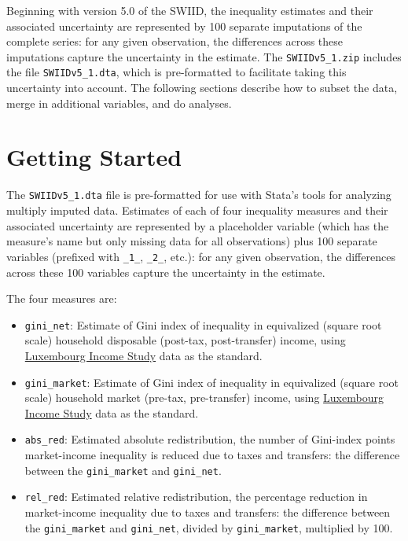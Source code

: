 \documentclass[11pt,]{article}
\providecommand{\tightlist}{%
	\setlength{\itemsep}{0pt}\setlength{\parskip}{0pt}}
\theoremstyle{definition}
\theoremstyle{definition}
\theoremstyle{remark}
\begin{document}
Beginning with version 5.0 of the SWIID, the inequality estimates and
their associated uncertainty are represented by 100 separate imputations
of the complete series: for any given observation, the differences
across these imputations capture the uncertainty in the estimate. The
\texttt{SWIIDv5\_1.zip} includes the file \texttt{SWIIDv5\_1.dta}, which
is pre-formatted to facilitate taking this uncertainty into account. The
following sections describe how to subset the data, merge in additional
variables, and do analyses.

\section{Getting Started}\label{getting-started}

The \texttt{SWIIDv5\_1.dta} file is pre-formatted for use with Stata's
tools for analyzing multiply imputed data. Estimates of each of four
inequality measures and their associated uncertainty are represented by
a placeholder variable (which has the measure's name but only missing
data for all observations) plus 100 separate variables (prefixed with
\texttt{\_1\_}, \texttt{\_2\_}, etc.): for any given observation, the
differences across these 100 variables capture the uncertainty in the
estimate.

The four measures are:

\begin{itemize}
\tightlist
\item
  \texttt{gini\_net}: Estimate of Gini index of inequality in
  equivalized (square root scale) household disposable (post-tax,
  post-transfer) income, using
  \href{http://www.lisdatacenter.org}{Luxembourg Income Study} data as
  the standard.
\item
  \texttt{gini\_market}: Estimate of Gini index of inequality in
  equivalized (square root scale) household market (pre-tax,
  pre-transfer) income, using
  \href{http://www.lisdatacenter.org}{Luxembourg Income Study} data as
  the standard.
\item
  \texttt{abs\_red}: Estimated absolute redistribution, the number of
  Gini-index points market-income inequality is reduced due to taxes and
  transfers: the difference between the \texttt{gini\_market} and
  \texttt{gini\_net}.
\item
  \texttt{rel\_red}: Estimated relative redistribution, the percentage
  reduction in market-income inequality due to taxes and transfers: the
  difference between the \texttt{gini\_market} and \texttt{gini\_net},
  divided by \texttt{gini\_market}, multiplied by 100.
\end{itemize}
\end{document}
